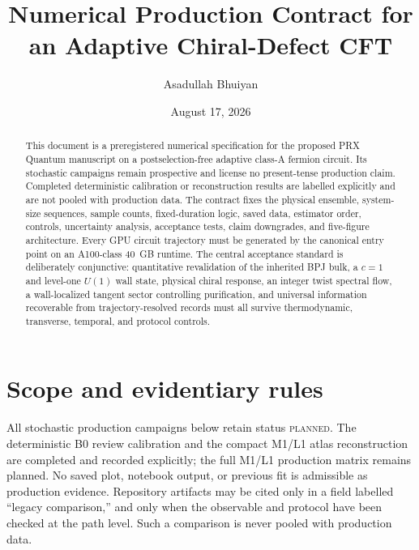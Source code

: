 \documentclass[aps,prx,twocolumn,floatfix,nofootinbib,superscriptaddress,longbibliography]{revtex4-2}
\newcommand{\planned}{\textsc{planned}}
\begin{document}
\title{Numerical Production Contract for an Adaptive Chiral-Defect CFT}
\author{Asadullah Bhuiyan}
\date{August 17, 2026}

\begin{abstract}
This document is a preregistered numerical specification for the proposed PRX Quantum
manuscript on a postselection-free adaptive class-A fermion circuit.  Its stochastic
campaigns remain prospective and license no present-tense production claim.  Completed
deterministic calibration or reconstruction results are labelled explicitly and are not
pooled with production data.  The contract fixes the physical
ensemble, system-size sequences, sample counts, fixed-duration logic, saved data, estimator order,
controls, uncertainty analysis, acceptance tests, claim downgrades, and five-figure
architecture.  Every GPU circuit trajectory must be generated by the canonical
 entry point on an A100-class 40~GB
runtime.  The central acceptance standard is deliberately conjunctive: quantitative
revalidation of the inherited BPJ bulk, a $c=1$ and level-one $U(1)$ wall state, physical chiral response, an integer
twist spectral flow, a wall-localized tangent sector controlling purification, and
universal information recoverable from trajectory-resolved records must all survive thermodynamic,
transverse, temporal, and protocol controls.
\end{abstract}

\maketitle
\setcounter{tocdepth}{2}
\tableofcontents
\clearpage

\section{Scope and evidentiary rules}

All stochastic production campaigns below retain status \planned.  The deterministic B0
review calibration and the compact M1/L1 atlas reconstruction are completed and recorded
explicitly; the full M1/L1 production matrix remains planned.  No
saved plot, notebook output, or previous fit
is admissible as production evidence.  Repository artifacts may be cited only in a field
labelled ``legacy comparison,'' and only when the observable and protocol have been checked
at the path level.  Such a comparison is never pooled with production data.
\end{document}
